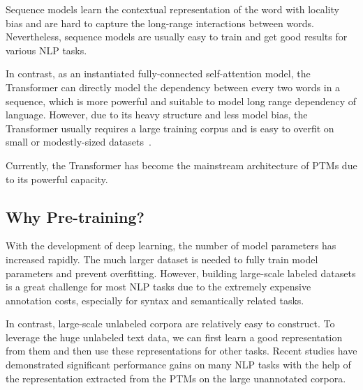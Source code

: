 \documentclass[fleqn]{SCYE-arxiv}
\begin{document}
\begin{multicols}{2}
Sequence models learn the contextual representation of the word with locality bias and are hard to capture the long-range interactions between words. Nevertheless, sequence models are usually easy to train and get good results for various NLP tasks.

In contrast, as an instantiated fully-connected self-attention model, the Transformer can directly model the dependency between every two words in a sequence, which is more powerful and suitable to model long range dependency of language.
However, due to its heavy structure and less model bias, the Transformer usually requires a large training corpus and is easy to overfit on small or modestly-sized datasets~\cite{radford2018improving,guo2019star}.

Currently, the Transformer has become the mainstream architecture of PTMs due to its powerful capacity.


\subsection{Why Pre-training?}

With the development of deep learning, the number of model parameters has increased rapidly. The much larger dataset is needed to fully train model parameters and prevent overfitting.
However, building large-scale labeled datasets is a great challenge for most NLP tasks due to the extremely expensive annotation costs, especially for syntax and semantically related tasks.

In contrast, large-scale unlabeled corpora are relatively easy to construct. To leverage the huge unlabeled text data, we can first learn a good representation from them and then use these representations for other tasks. Recent studies have demonstrated significant performance gains on many NLP tasks with the help of the representation extracted from the PTMs on the large unannotated corpora.




\end{multicols}
\end{document}
